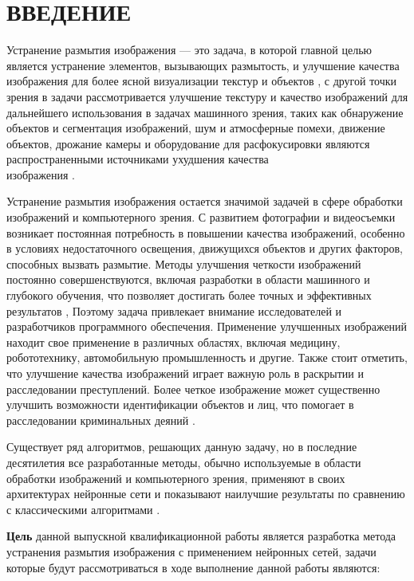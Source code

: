 \part*{ВВЕДЕНИЕ}

Устранение размытия изображения --- это задача, в которой главной целью является устранение элементов, вызывающих размытость, и улучшение качества изображения для более ясной визуализации текстур и объектов \cite{shen2018deep}, с другой точки зрения в задачи рассмотривается улучшение текстуру и качество изображений для дальнейшего использования в задачах машинного зрения, таких как обнаружение объектов и сегментация изображений, шум и атмосферные помехи, движение объектов, дрожание камеры и оборудование для расфокусировки являются распространенными источниками ухудшения качества \\ изображения \cite{NIPS2009_3dd48ab3}.

Устранение размытия изображения остается значимой задачей в сфере обработки изображений и компьютерного зрения. С развитием фотографии и видеосъемки возникает постоянная потребность в повышении качества изображений, особенно в условиях недостаточного освещения, движущихся объектов и других факторов, способных вызвать размытие. Методы улучшения четкости изображений постоянно совершенствуются, включая разработки в области машинного и глубокого обучения, что позволяет достигать более точных и эффективных результатов \cite{Lian2023}, Поэтому задача привлекает внимание исследователей и разработчиков программного обеспечения. Применение улучшенных изображений находит свое применение в различных областях, включая медицину, робототехнику, автомобильную промышленность и другие. Также стоит отметить, что улучшение качества изображений играет важную роль в раскрытии и расследовании преступлений. Более четкое изображение может существенно улучшить возможности идентификации объектов и лиц, что помогает в расследовании криминальных деяний \cite{sun2010}.

Существует ряд алгоритмов, решающих данную задачу, но в последние десятилетия все разработанные методы, обычно используемые в области обработки изображений и компьютерного зрения, применяют в своих архитектурах нейронные сети и показывают наилучшие результаты по сравнению с классическими алгоритмами \cite{zhang2022deep}. 

\textbf{Цель} данной выпускной квалификационной работы является разработка метода устранения размытия изображения с применением нейронных сетей, задачи которые будут рассмотриваться в ходе выполнение данной работы являются:

